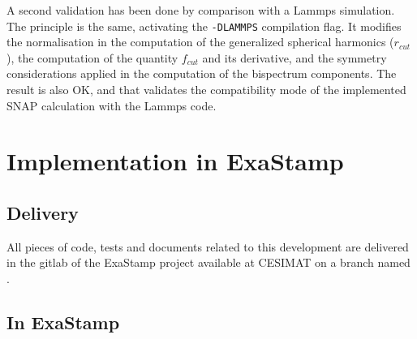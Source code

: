 \documentclass[12pt]{article}
\begin{document}
A second validation has been done by comparison with a Lammps simulation. The principle is the same, activating the \verb=-DLAMMPS= compilation flag. It modifies the normalisation in the computation of the generalized spherical harmonics ($r_{cut}$), the computation of the quantity $f_{cut}$ and its derivative, and the symmetry considerations applied in the computation of the bispectrum components. The result is also OK, and that validates the compatibility mode of the implemented SNAP calculation with the Lammps code.
  \section{Implementation in ExaStamp}


    \subsection{Delivery}

      All pieces of code, tests and documents related to this development are delivered in the gitlab of the ExaStamp
      project available at CESIMAT on a branch named .

    \subsection{In ExaStamp}
\end{document}
